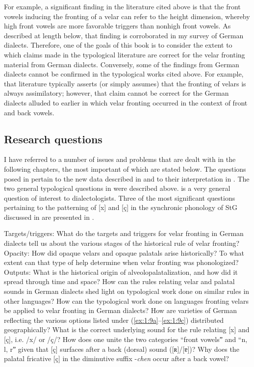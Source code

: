 For example, a significant finding in the literature cited above is that the front vowels inducing the fronting of a velar can refer to the height dimension, where\-by high front vowels are more favorable triggers than nonhigh front vowels. As described at length below, that finding is corroborated in my survey of German dialects. Therefore, one of the goals of this book is to consider the extent to which claims made in the typological literature are correct for the velar fronting material from German dialects. Conversely, some of the findings from German dialects cannot be confirmed in the typological works cited above. For example, that literature typically asserts (or simply assumes) that the fronting of velars is always assimilatory; however, that claim cannot be correct for the German dialects alluded to earlier in which velar fronting occurred in the context of front and back vowels.  

\subsection{Research questions}\label{sec:1.4.4}

I have referred to a number of issues and problems that are dealt with in the following chapters, the most important of which are stated below. The questions posed in  pertain to the new data described in  and to their interpretation in . The two general typological questions in  were described above.  is a very general question of interest to dialectologists. Three of the most significant questions pertaining to the patterning of [x] and [ç] in the synchronic phonology of StG discussed in  are presented in .

\eanoraggedright%
    \label{ex:1:9}
\eanoraggedright\label{ex:1:9a}Targets/triggers: What do the targets and triggers for velar fronting in German dialects tell us about the various stages of the historical rule of velar fronting?
\ex\label{ex:1:9b}Opacity: How did opaque velars and opaque palatals arise historically? To what extent can that type of  help determine when velar fronting was phonologized?
\ex\label{ex:1:9c}Outputs: What is the historical origin of alveolopalatalization, and how did it spread through time and space?
\z
\ex%
    \label{ex:1:10}
\eanoraggedright  How can the rules relating velar and palatal sounds in German dialects shed light on typological work done on similar rules in other languages?
\ex  How can the typological work done on languages fronting velars be applied to velar fronting in German dialects?
\z
\ex%
    \label{ex:1:11}
      How are varieties of German reflecting the various options listed under (\ref{ex:1:9a}--\ref{ex:1:9c}) distributed geographically?
\ex%
    \label{ex:1:12}
\eanoraggedright\label{ex:1:12a}What is the correct underlying sound for the rule relating [x] and [ç], i.e. /x/ or /ç/?
\ex\label{ex:1:12b}How does one unite the two categories “front vowelsˮ and “n, l, rˮ given that [ç] surfaces after a back (dorsal) sound ([ʀ]/[ɐ])?
\ex\label{ex:1:12c}Why does the palatal fricative [ç] in the diminutive suffix -\textit{chen} occur after a back vowel?
\z
\z

